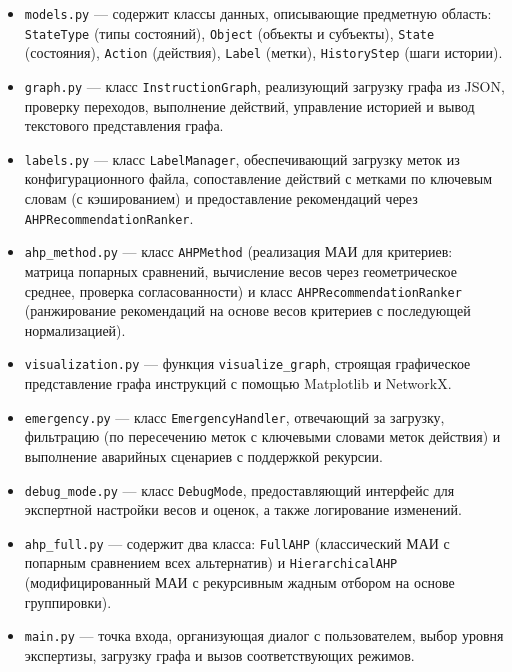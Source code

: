 \begin{itemize}
    \item \texttt{models.py} --- содержит классы данных, описывающие предметную область: \texttt{StateType} (типы состояний), \texttt{Object} (объекты и субъекты), \texttt{State} (состояния), \texttt{Action} (действия), \texttt{Label} (метки), \texttt{HistoryStep} (шаги истории).

    \item \texttt{graph.py} --- класс \texttt{InstructionGraph}, реализующий загрузку графа из JSON, проверку переходов, выполнение действий, управление историей и вывод текстового представления графа.

    \item \texttt{labels.py} --- класс \texttt{LabelManager}, обеспечивающий загрузку меток из конфигурационного файла, сопоставление действий с метками по ключевым словам (с кэшированием) и предоставление рекомендаций через \texttt{AHPRecommendationRanker}.

    \item \texttt{ahp\_method.py} --- класс \texttt{AHPMethod} (реализация МАИ для критериев: матрица попарных сравнений, вычисление весов через геометрическое среднее, проверка согласованности) и класс \texttt{AHPRecommendationRanker} (ранжирование рекомендаций на основе весов критериев с последующей нормализацией).

    \item \texttt{visualization.py} --- функция \texttt{visualize\_graph}, строящая графическое представление графа инструкций с помощью Matplotlib и NetworkX.

    \item \texttt{emergency.py} --- класс \texttt{EmergencyHandler}, отвечающий за загрузку, фильтрацию (по пересечению меток с ключевыми словами меток действия) и выполнение аварийных сценариев с поддержкой рекурсии.

    \item \texttt{debug\_mode.py} --- класс \texttt{DebugMode}, предоставляющий интерфейс для экспертной настройки весов и оценок, а также логирование изменений.

    \item \texttt{ahp\_full.py} --- содержит два класса: \texttt{FullAHP} (классический МАИ с попарным сравнением всех альтернатив) и \texttt{HierarchicalAHP} (модифицированный МАИ с рекурсивным жадным отбором на основе группировки).

    \item \texttt{main.py} --- точка входа, организующая диалог с пользователем, выбор уровня экспертизы, загрузку графа и вызов соответствующих режимов.
\end{itemize}


